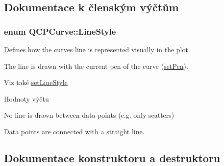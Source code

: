 \subsection{Dokumentace k členským výčtům}
\hypertarget{classQCPCurve_a2710e9f79302152cff794c6e16cc01f1}{}
\subsubsection[{Line\+Style}]{\setlength{\rightskip}{0pt plus 5cm}enum {\bf Q\+C\+P\+Curve\+::\+Line\+Style}}\label{classQCPCurve_a2710e9f79302152cff794c6e16cc01f1}


Defines how the curve\textquotesingle{}s line is represented visually in the plot. 

The line is drawn with the current pen of the curve (\hyperlink{classQCPAbstractPlottable_ab74b09ae4c0e7e13142fe4b5bf46cac7}{set\+Pen}). \begin{DoxySeeAlso}{Viz také}
\hyperlink{classQCPCurve_a4a377ec863ff81a1875c3094a6177c19}{set\+Line\+Style} 
\end{DoxySeeAlso}
\begin{Desc}
\item[Hodnoty výčtu]\par
\begin{description}
\item[{\em 
\hypertarget{classQCPCurve_a2710e9f79302152cff794c6e16cc01f1aec1601a191cdf0b4e761c4c66092cc48}{}ls\+None\label{classQCPCurve_a2710e9f79302152cff794c6e16cc01f1aec1601a191cdf0b4e761c4c66092cc48}
}]No line is drawn between data points (e.\+g. only scatters) \item[{\em 
\hypertarget{classQCPCurve_a2710e9f79302152cff794c6e16cc01f1ade5822ce6fbf131d3df131795c2e1003}{}ls\+Line\label{classQCPCurve_a2710e9f79302152cff794c6e16cc01f1ade5822ce6fbf131d3df131795c2e1003}
}]Data points are connected with a straight line. \end{description}
\end{Desc}


\subsection{Dokumentace konstruktoru a destruktoru}
\hypertarget{classQCPCurve_a36de58e2652b3fa47bdf9187d421d3ce}{}
